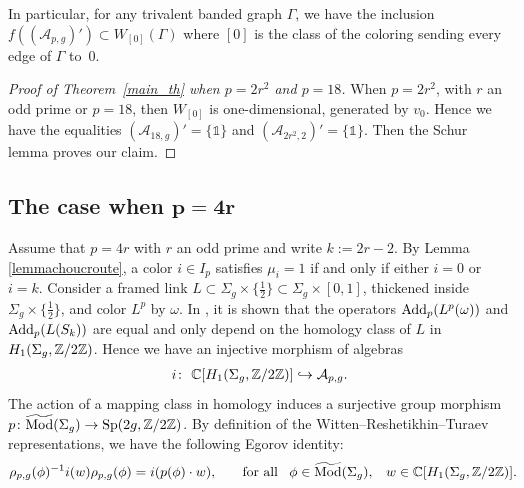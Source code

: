 \documentclass[pdftex]{sigma}
\numberwithin{equation}{section}
\begin{document}
In particular, for any trivalent banded graph $\Gamma$, we have the inclusion $ f ( (\mathcal{A}_{p,g})' ) \subset W_{[0]}(\Gamma)$ where $[0]$ is the class of the coloring sending every edge of $\Gamma$ to~$0$.
\begin{proof}[Proof of Theorem~\ref{main_th} when $p=2r^2$ and $p=18$] When $p=2r^2$, with $r$ an odd prime or $p=18$, then $W_{[0]}$ is one-dimensional, generated by $v_0$. Hence we have the equalities $(\mathcal{A}_{18, g})' = \{ \mathds{1} \}$ and $(\mathcal{A}_{2r^2, 2})' = \{ \mathds{1} \}$. Then the Schur lemma proves our claim.
\end{proof}

\subsection[The case when $p=4r$]{The case when $\boldsymbol{p=4r}$}\label{section4.1}

Assume that $p=4r$ with $r$ an odd prime and write $k:=2r-2$. By Lemma \ref{lemmachoucroute}, a color $i\in I_{p}$ satisfies $\mu_i = 1$ if and only if either $i=0$ or $i=k$. Consider a framed link $L\subset \Sigma_g\times \{\frac{1}{2}\}\subset \Sigma_g\times [0,1]$, thickened inside $\Sigma_g\times \{\frac{1}{2} \}$, and color $L^p $ by $\omega$. In \cite[Section~7]{BHMV2}, it is shown that the operators $\operatorname{Add}_p(L^p(\omega))$ and $\operatorname{Add}_p(L(S_k))$ are equal and only depend on the homology class of $L$ in $H_1(\Sigma_g, \mathbb{Z}/2\mathbb{Z})$. Hence we have an injective morphism of algebras
\begin{gather*} i \colon \ \mathbb{C} [ H_1(\Sigma_g, \mathbb{Z}/2\mathbb{Z})] \hookrightarrow \mathcal{A}_{p,g}.\end{gather*}
The action of a mapping class in homology induces a surjective group morphism $p\colon \widetilde{\operatorname{Mod}}(\Sigma_g) \rightarrow \operatorname{Sp}( 2g, \mathbb{Z}/2\mathbb{Z})$. By definition of the Witten--Reshetikhin--Turaev representations, we have the following Egorov identity:
\begin{gather}\label{Egorov} \rho_{p,g}(\phi)^{-1}i(w)\rho_{p,g}(\phi) = i ( p(\phi)\cdot w ), \qquad\! \text{for all} \quad\! \phi\in \widetilde{\operatorname{Mod}}(\Sigma_g),\quad\! w\in \mathbb{C} [ H_1(\Sigma_g, \mathbb{Z}/2\mathbb{Z})]. \!\!\! \end{gather}
\end{document}
